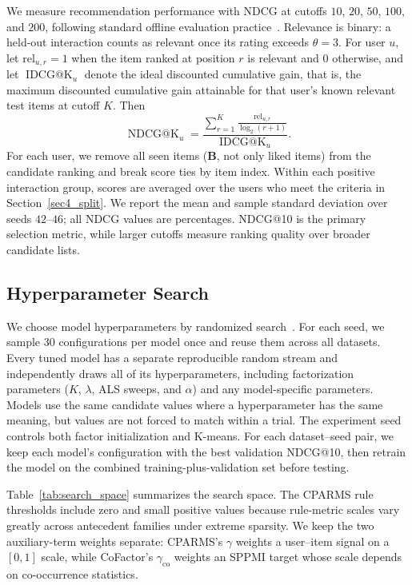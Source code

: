 \documentclass[pdflatex,sn-vancouver-num]{sn-jnl}%
\theoremstyle{thmstyleone}%
\theoremstyle{thmstyletwo}%
\theoremstyle{thmstylethree}%
\begin{document}
We measure recommendation performance with NDCG at cutoffs $10$, $20$, $50$, $100$, and $200$, following standard offline evaluation practice~\cite{zangerle2022fevr}. Relevance is binary: a held-out interaction counts as relevant once its rating exceeds $\theta=3$. For user $u$, let $\mathrm{rel}_{u,r}=1$ when the item ranked at position $r$ is relevant and $0$ otherwise, and let $\operatorname{IDCG@K}_u$ denote the ideal discounted cumulative gain, that is, the maximum discounted cumulative gain attainable for that user's known relevant test items at cutoff $K$. Then
\begin{equation}
\operatorname{NDCG@K}_u
=
\frac{
\displaystyle
\sum_{r=1}^{K}
\frac{\mathrm{rel}_{u,r}}
{\log_2(r+1)}
}{
\operatorname{IDCG@K}_u
}.
\label{eq:ndcg}
\end{equation}
For each user, we remove all seen items ($\mathbf{B}$, not only liked items) from the candidate ranking and break score ties by item index. Within each positive interaction group, scores are averaged over the users who meet the criteria in Section~\ref{sec4_split}. We report the mean and sample standard deviation over seeds $42$--$46$; all NDCG values are percentages. NDCG@10 is the primary selection metric, while larger cutoffs measure ranking quality over broader candidate lists.

\subsection{Hyperparameter Search}\label{sec4_hyperparameter}

We choose model hyperparameters by randomized search~\cite{bergstra2012random}. For each seed, we sample $30$ configurations per model once and reuse them across all datasets. Every tuned model has a separate reproducible random stream and independently draws all of its hyperparameters, including factorization parameters ($K$, $\lambda$, ALS sweeps, and $\alpha$) and any model-specific parameters. Models use the same candidate values where a hyperparameter has the same meaning, but values are not forced to match within a trial. The experiment seed controls both factor initialization and K-means. For each dataset--seed pair, we keep each model's configuration with the best validation NDCG@10, then retrain the model on the combined training-plus-validation set before testing.

Table~\ref{tab:search_space} summarizes the search space. The CPARMS rule thresholds include zero and small positive values because rule-metric scales vary greatly across antecedent families under extreme sparsity. We keep the two auxiliary-term weights separate: CPARMS's $\gamma$ weights a user--item signal on a $[0,1]$ scale, while CoFactor's $\gamma_{\mathrm{co}}$ weights an SPPMI target whose scale depends on co-occurrence statistics.
\end{document}
